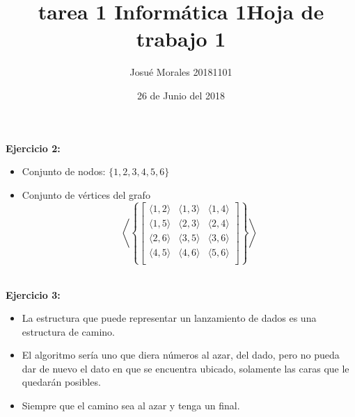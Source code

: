 \documentclass[10pt,a4paper]{article}
\author{Josué Morales 20181101}
\title{tarea 1 Informática 1}
\date{26 de Junio del 2018}
\begin{document}
 \title{\bf Hoja de trabajo 1}
 \maketitle
{\bf Ejercicio 2:}
 
  \begin{itemize}
   \item{Conjunto de nodos: $\{1,2,3,4,5,6\}$}
   
   \item Conjunto de vértices del grafo
  $$
        \left\langle \left\{
            \begin{bmatrix}
                \langle 1,2 \rangle & \langle 1, 3\rangle & \langle 1,4   \rangle \\
                \langle 1,5 \rangle & \langle 2,3 \rangle & \langle 2,4 \rangle \\
                \langle 2,6 \rangle & \langle 3,5 \rangle & \langle 3,6 \rangle \\
                \langle 4,5 \rangle & \langle 4,6 \rangle & \langle 5,6 \rangle \\
            \end{bmatrix}
        \right\} \right\rangle
    $$ \\
  \end{itemize}

  {\bf Ejercicio 3:}
    \begin{itemize}
  	\item La estructura que puede representar un lanzamiento de dados es una estructura de camino.
  	
  	\item El algoritmo sería uno que diera números al azar, del dado, pero no pueda dar de nuevo el dato en que se encuentra ubicado, solamente las caras que le quedarán posibles.
  	
  	\item Siempre que el camino sea al azar y tenga un final.
  	
  	\end{itemize}
  	
  	

 
\end{document}
